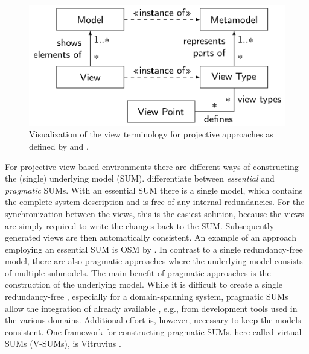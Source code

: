 \begin{figure}
    \begin{center}
        \includegraphics[width=\linewidth]{images/ViewTypeTerminology.png}
    \end{center}

    \caption{Visualization of the view terminology for projective approaches as defined by \textcite{burger_flexible_2014} and \textcite{klare_enabling_2021}.}
    \label{fig:view_concept}
\end{figure}

For projective view-based environments there are different ways of constructing the (single) underlying model (SUM).
\Textcite{atkinson_fundamental_2015} differentiate between \emph{essential} and \emph{pragmatic} SUMs.
With an essential SUM there is a single model, which contains the complete system description and is free of any internal redundancies.
For the synchronization between the views, this is the easiest solution, because the views are simply required to write the changes back to the SUM.
Subsequently generated views are then automatically consistent.
An example of an approach employing an essential SUM is OSM by \textcite{atkinson_orthographic_2010}.
In contrast to a single redundancy-free model, there are also pragmatic approaches where the underlying model consists of multiple submodels.
The main benefit of pragmatic approaches is the construction of the underlying model.
While it is difficult to create a single redundancy-free \metamodel, especially for a domain-spanning system, pragmatic SUMs allow the integration of already available \metamodels, e.g., from development tools used in the various domains.
Additional effort is, however, necessary to keep the models consistent.
One framework for constructing pragmatic SUMs, here called virtual SUMs (V-SUMs), is Vitruvius \autocite{klare_enabling_2021}.

